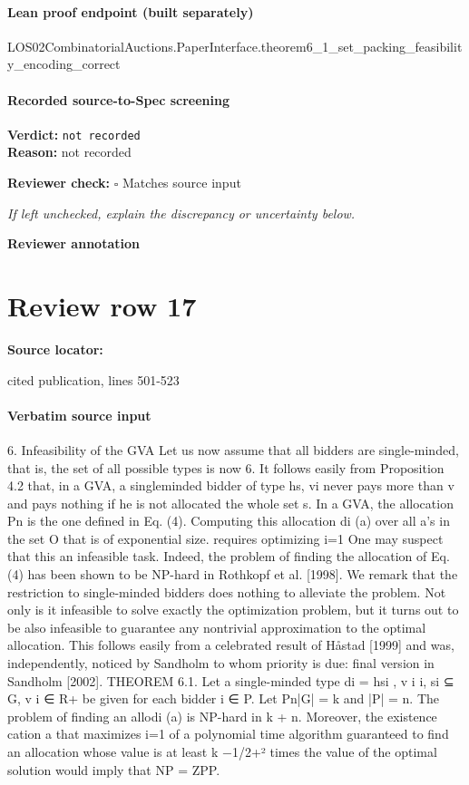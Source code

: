 \documentclass[10pt]{article}
\newcommand{\reviewerbox}{%
  \par\noindent\fbox{\parbox{0.96\linewidth}{\rule{0pt}{0.38in}}}\par
}
\newcommand{\reviewmatch}[1]{%
  \par\noindent\textbf{Reviewer check:} $\square$\; #1\par
  \noindent\emph{If left unchecked, explain the discrepancy or uncertainty below.}\par
}
\begin{document}
\paragraph{Lean proof endpoint (built separately)}\begin{ReviewVerbatim}
LOS02CombinatorialAuctions.PaperInterface.theorem6_1_set_packing_feasibility_encoding_correct
\end{ReviewVerbatim}

\paragraph{Recorded source-to-Spec screening}
\textbf{Verdict:} \texttt{not recorded}
\\
\textbf{Reason:} not recorded
\reviewmatch{Matches source input}
\noindent\textbf{Reviewer annotation}\par
\reviewerbox
\clearpage
\hypertarget{source-claim-d0d92dc8489e3ec0}{}
\section*{Review row 17}
\textbf{Source locator:} {\footnotesize\raggedright cited publication, lines 501-\allowbreak{}523\par}
\paragraph{Verbatim source input}
\begin{ReviewVerbatim}
6. Infeasibility of the GVA
Let us now assume that all bidders are single-minded, that is, the set of all possible
types is now 6. It follows easily from Proposition 4.2 that, in a GVA, a singleminded bidder of type hs, vi never pays more than v and pays nothing if he is not
allocated the whole set s.
In a GVA, the allocation
Pn is the one defined in Eq. (4). Computing this allocation
di (a) over all a’s in the set O that is of exponential size.
requires optimizing i=1
One may suspect that this an infeasible task. Indeed, the problem of finding the
allocation of Eq. (4) has been shown to be NP-hard in Rothkopf et al. [1998]. We
remark that the restriction to single-minded bidders does nothing to alleviate the
problem. Not only is it infeasible to solve exactly the optimization problem, but
it turns out to be also infeasible to guarantee any nontrivial approximation to the
optimal allocation. This follows easily from a celebrated result of Håstad [1999]
and was, independently, noticed by Sandholm to whom priority is due: final version
in Sandholm [2002].
THEOREM 6.1. Let a single-minded type di = hsi , v i i, si ⊆ G, v i ∈ R+ be given
for each bidder i ∈ P. Let
Pn|G| = k and |P| = n. The problem of finding an allodi (a) is NP-hard in k + n. Moreover, the existence
cation a that maximizes i=1
of a polynomial time algorithm guaranteed to find an allocation whose value is at
least k −1/2+² times the value of the optimal solution would imply that NP = ZPP.
\end{ReviewVerbatim}
\end{document}
